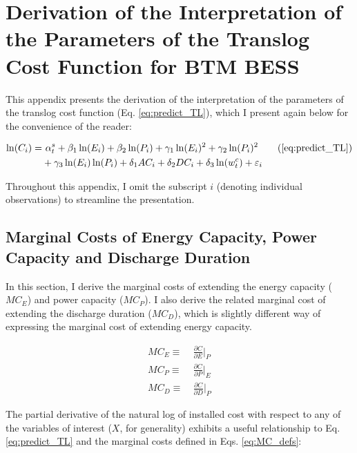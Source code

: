\section{Derivation of the Interpretation of the Parameters of the Translog Cost Function for BTM BESS}\label{apdx:TL_interpretation}

This appendix presents the derivation of the interpretation of the parameters of the translog cost function (Eq. \ref{eq:predict_TL}), which I present again below for the convenience of the reader:

\begin{align*}
    \ln(C_i) = &~\alpha^{s}_{t} + \beta_1 \ln(E_i) + \beta_2 \ln(P_i) + \gamma_1 \ln(E_i)^2 + \gamma_2 \ln(P_i)^2  \tag{\ref{eq:predict_TL}} \\
		 & + \gamma_3 \ln(E_i) \ln(P_i) + \delta_1 AC_i + \delta_2 DC_i + \delta_3 \ln(w^{c}_{t}) + \varepsilon_i \nonumber
\end{align*}

Throughout this appendix, I omit the subscript $i$ (denoting individual observations) to streamline the presentation. 

\subsection{Marginal Costs of Energy Capacity, Power Capacity and Discharge Duration}\label{apdx:mc_derivation}

In this section, I derive the marginal costs of extending the energy capacity ($MC_{E}$) and power capacity ($MC_{P}$). I also derive the related marginal cost of extending the discharge duration ($MC_{D}$), which is slightly different way of expressing the marginal cost of extending energy capacity.

\begin{subequations}\label{eq:MC_defs}
\begin{align}
	MC_{E} \equiv &~\frac{\partial C}{\partial E}\Big\rvert_{P} \label{eq:MCe_def} \\
	MC_{P} \equiv &~\frac{\partial C}{\partial P}\Big\rvert_{E}\label{eq:MCp_def} \\
	MC_{D} \equiv &~\frac{\partial C}{\partial D}\Big\rvert_{P}  \label{eq:MCd_def} 
\end{align}
\end{subequations}

The partial derivative of the natural log of installed cost with respect to any of the variables of interest ($X$, for generality) exhibits a useful relationship to Eq. \ref{eq:predict_TL} and the marginal costs defined in Eqs. \ref{eq:MC_defs}:

